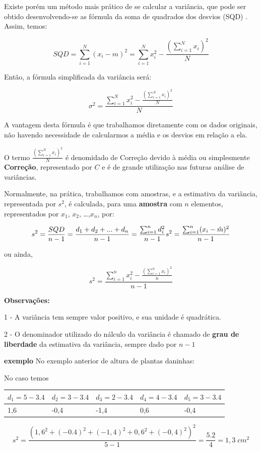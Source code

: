 \documentclass[
]{book}
\begin{document}
Existe porém um método mais prático de se calcular a variância, que pode ser obtido desenvolvendo-se as fórmula da soma de quadrados dos desvios (SQD) . Assim, temos:

\[
SQD = \sum_{i=1}^N(x_i-m)^2 = \sum_{i=1}^Nx_i^2-\frac{(\sum_{i=1}^N x_i)^2}{N}
\]

Então, a fórmula simplificada da variância será:

\[
\sigma^2 =\frac{\sum_{i=1}^Nx_i^2-\frac{(\sum_{i=1}^N x_i)^2}{N}}{N}
\]

A vantagem desta fórmula é que trabalhamos diretamente com os dados originais, não havendo necessidade de calcularmos a média e os desvios em relação a ela.

O termo \(\frac{(\sum_{i=1}^Nx_i)^2}{N}\) é denomidado de Correção devido à média ou simplesmente \textbf{Correção}, representado por \(C\) e é de grande utilização nas futuras análise de variâncias.

Normalmente, na prática, trabalhamos com amostras, e a estimativa da variância, representada por \(s^2\), é calculada, para uma \textbf{amostra} com \(n\) elementos, representados por \(x_1\), \(x_2\), \ldots,\(x_n\), por:

\[
s^2 = \frac{SQD}{n-1} = \frac{d_1+d_2+...+d_n}{n-1} =\frac{\sum_{i=1}^nd_i^2}{n-1} \\
s^2 =\frac{\sum_{i=1}^n(x_i-\hat{m})^2}{n-1}
\]

ou ainda,

\[
s^2 =\frac{\sum_{i=1}^nx_i^2-\frac{(\sum_{i=1}^n x_i)^2}{n}}{n-1}
\]

\textbf{Observações:}

1 - A variância tem sempre valor positivo, e sua unidade é quadrática.

2 - O denominador utilizado do nálculo da variância é chamado de \textbf{grau de liberdade} da estimativa da variância, sempre dado por \(n-1\)

\textbf{exemplo}
No exemplo anterior de altura de plantas daninhas:

No caso temos

\begin{longtable}[]{@{}lllll@{}}
\toprule
\(d_1 = 5-3.4\) & \(d_2=3-3.4\) & \(d_3 = 2-3.4\) & \(d_4 = 4-3.4\) & \(d_5 = 3-3.4\)\tabularnewline
\midrule
\endhead
1,6 & -0,4 & -1,4 & 0,6 & -0,4\tabularnewline
\bottomrule
\end{longtable}

\[
s^2 =\frac{(1,6^2+(-0.4)^2+(-1,4)^2+0,6^2+(-0,4)^2)^2}{5-1} = \frac{5.2}{4} = 1,3 \;cm^2
\]
\end{document}
